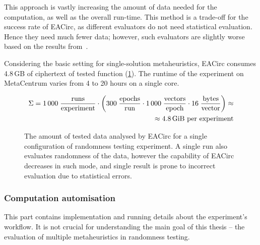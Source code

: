 \documentclass[
    digital,    %
    oneside,    %
    color,
    11pt,
    nocover,
    notable,
    nolof,
    nolot,
]{fithesis3}
\begin{document}
This approach is vastly increasing the amount of data needed for the computation, as well as the overall run-time. This method is a trade-off for the success rate of EACirc, as different evaluators do not need statistical evaluation. Hence they need much fewer data; however, such evaluators are slightly worse based on the results from~\cite{svenda2013towards}.

Considering the basic setting for single-solution metaheuristics, EACirc consumes 4.8\,GB of ciphertext of tested function (\cref{fig:dataUsage}). The runtime of the experiment on MetaCentrum varies from 4 to 20 hours on a single core.

\begin{figure}[t]
    \begin{equation*}
        \begin{aligned}
    \Sigma = 1\,000 \;
             \frac{\textnormal{runs}}
                  {\textnormal{experiment}}
             \cdot
             \left(
             300 \;
             \frac{\textnormal{epochs}}
                  {\textnormal{run}}
             \cdot
             1\,000 \;
             \frac{\textnormal{vectors}}
                  {\textnormal{epoch}}
             \cdot
             16 \;
             \frac{\textnormal{bytes}}
                  {\textnormal{vector}}
             \right) \approx\\
             \approx 4.8 \textnormal{\,GiB per experiment}
        \end{aligned}
    \end{equation*}
    \caption{The amount of tested data analysed by EACirc for a single configuration of randomness testing experiment. A single run also evaluates randomness of the data, however the capability of EACirc decreases in such mode, and single result is prone to incorrect evaluation due to statistical errors.}
    \label{fig:dataUsage}
\end{figure}


\subsubsection{\textbf{Computation automisation}}
\label{subsubsec:method-spec-ss-auto}

This part contains implementation and running details about the experiment's workflow. It is not crucial for understanding the main goal of this thesis -- the evaluation of multiple metaheuristics in randomness testing.
\end{document}
